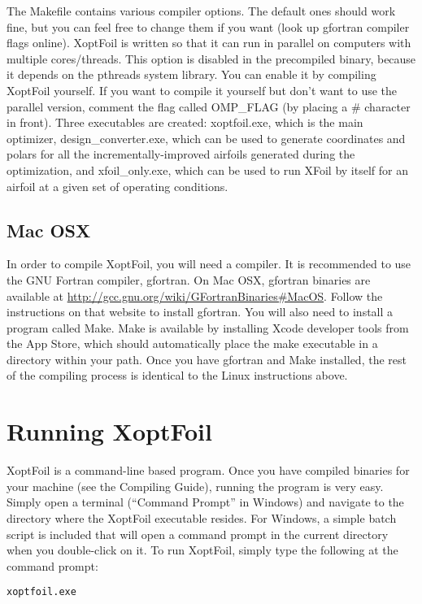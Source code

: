 \documentclass[11pt]{article}
\begin{document}
The Makefile contains various compiler options.  The default ones should work fine, but
you can feel free to change them if you want (look up gfortran compiler flags online).
XoptFoil is written so that it can run in parallel on computers with multiple
cores/threads.  This option is disabled in the precompiled binary, because it depends on
the pthreads system library.  You can enable it by compiling XoptFoil yourself.  If you
want to compile it yourself but don't want to use the parallel version, comment the flag
called OMP\_FLAG (by placing a \# character in front). Three executables are
created: xoptfoil.exe, which is the main optimizer, design\_converter.exe, which can be used
to generate coordinates and polars for all the incrementally-improved airfoils generated
during the optimization, and xfoil\_only.exe, which can be used to run XFoil by itself for
an airfoil at a given set of operating conditions.

\subsection{Mac OSX}

In order to compile XoptFoil, you will need a compiler.  It is recommended to use the GNU
Fortran compiler, gfortran.  On Mac OSX, gfortran binaries are available at 
\url{http://gcc.gnu.org/wiki/GFortranBinaries#MacOS}.  Follow the instructions on that
website to install gfortran.  You will also need to install a program called Make.  Make
is available by installing Xcode developer tools from the App Store, which should
automatically place the make executable in a directory within your path. Once you have
gfortran and Make installed, the rest of the compiling process is identical to the Linux
instructions above.

\section{Running XoptFoil}

XoptFoil is a command-line based program.  Once you have compiled binaries for your
machine (see the Compiling Guide), running the program is very easy.  Simply open a
terminal (``Command Prompt'' in Windows) and navigate to the directory where the XoptFoil
executable resides.  For Windows, a simple batch script is included that will open a
command prompt in the current directory when you double-click on it.  To run XoptFoil,
simply type the following at the command prompt:

\begin{verbatim}
xoptfoil.exe
\end{verbatim}
\end{document}
